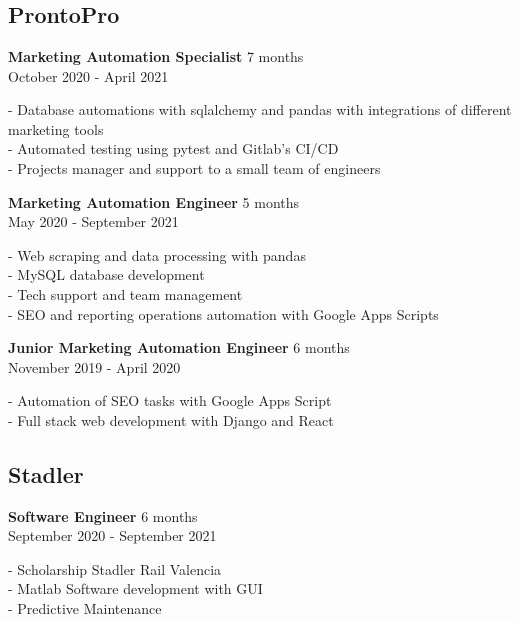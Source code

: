 \section{\faBriefcase} \label{sec:experience}

\subsection{ProntoPro}
\textbf{Marketing Automation Specialist} \hfill 7 months \\ 
{\footnotesize October 2020 - April 2021} \\
{
    \raggedright
    - Database automations with sqlalchemy and pandas with
    integrations of different marketing tools \\
    - Automated testing using pytest and Gitlab's CI/CD \\
    - Projects manager and support to a small team of engineers \\
}

\textbf{Marketing Automation Engineer} \hfill 5 months \\ 
{\footnotesize May 2020 - September 2021} \\
{
    \raggedright
    - Web scraping and data processing with pandas \\
    - MySQL database development \\
    - Tech support and team management \\
    - SEO and reporting operations automation with Google Apps Scripts \\
}

\textbf{Junior Marketing Automation Engineer} \hfill 6 months \\ 
{\footnotesize November 2019 - April 2020} \\
{
    \raggedright
    - Automation of SEO tasks with Google Apps Script \\
    - Full stack web development with Django and React \\
}

\medskip
\subsection{Stadler}
\textbf{Software Engineer} \hfill 6 months \\ 
{\footnotesize September 2020 - September 2021} \\
{
    \raggedright
    - Scholarship Stadler Rail Valencia \\
    - Matlab Software development with GUI \\
    - Predictive Maintenance \\
}